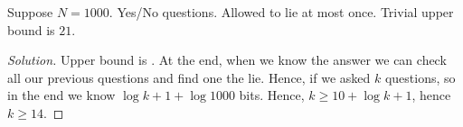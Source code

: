 \begin{application}
    Suppose $N = 1000$.
    Yes/No questions.
    Allowed to lie at most once.
    Trivial upper bound is $21$.
\end{application}
\begin{proof}[Solution]
    Upper bound is \hw. %
    At the end, when we know the answer we can check all our previous questions and find one the lie.
    Hence, if we asked $k$ questions, so in the end we know $\log {k + 1} + \log 1000$ bits.
    Hence, $k \geq 10 + \log {k + 1}$, hence $k \geq 14$.
\end{proof}
